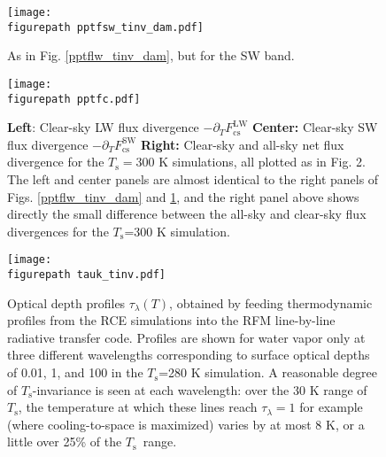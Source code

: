 \documentclass[9pt,twoside,lineno]{pnas-new}
\newcommand{\ppt}{\ensuremath{\partial_T}}
\newcommand{\FLWcs}{\ensuremath{F^\mathrm{LW}_{\mathrm{cs}}}}
\newcommand{\FSWcs}{\ensuremath{F^\mathrm{SW}_{\mathrm{cs}}}}
\newcommand{\tauk}{\ensuremath{\tau_\lambda}}
\newcommand{\Ts}{\ensuremath{T_\mathrm{s}}}
\newcommand{\figurepath}{../../../figures_paper/}
\begin{document}
\begin{figure}[h]
        \begin{center}
                        \texttt{[image: \\figurepath pptfsw\_tinv\_dam.pdf]}
		\caption{As in  Fig. \ref{pptflw_tinv_dam}, but for the SW band.
		\label{pptfsw_tinv_dam}                
		}
        \end{center}
\end{figure}

\begin{figure}[h]
        \begin{center}
                        \texttt{[image: \\figurepath pptfc.pdf]}
                \caption{\textbf{Left}: Clear-sky LW flux divergence  $-\ppt \FLWcs$ \textbf{Center:} Clear-sky SW flux divergence  $-\ppt \FSWcs$  \textbf{Right:} Clear-sky and all-sky  net flux divergence for the $\Ts=300$ K simulations, all plotted as in Fig. 2. The left and center panels are almost identical to the right panels of Figs. \ref{pptflw_tinv_dam} and \ref{pptfsw_tinv_dam}, and the right panel above shows directly the small difference between the all-sky and clear-sky flux divergences for the \Ts=300 K simulation. 
                \label{pptfc}
                }
        \end{center}
\end{figure}


\begin{figure}[h]
        \begin{center}
                        \texttt{[image: \\figurepath tauk\_tinv.pdf]}
                \caption{Optical depth profiles $\tauk(T)$, obtained by feeding thermodynamic profiles from the RCE simulations  into the RFM line-by-line radiative transfer code. Profiles are shown for water vapor only at three different wavelengths corresponding to surface optical depths of 0.01, 1, and 100 in the \Ts=280 K simulation. A reasonable degree of \Ts-invariance is seen at each wavelength: over the 30 K range of \Ts,  the temperature at which these lines reach $\tauk=1$ for example (where cooling-to-space is maximized) varies by at most 8 K, or a little over 25\% of the \Ts\ range.
                \label{tauk_tinv}
                }
        \end{center}
\end{figure}


\end{document}
